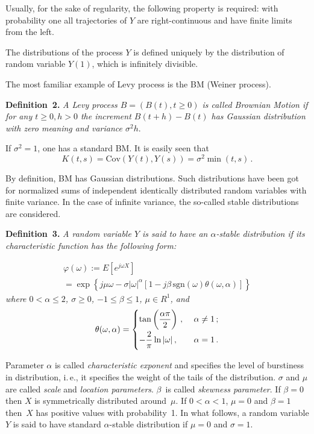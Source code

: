 \begin{multicols}{2}
\smallskip

Usually, for the sake of regularity,  the following property is required: with 
probability one all trajectories of $Y$ are right-continuous and have finite limits 
from the left. 

The distributions of the process $Y$ is defined uniquely by the distribution of 
random variable $Y(1)$, which is infinitely divisible. 

The most familiar example of Levy process is the BM (Weiner process). 

\smallskip

\noindent
\textbf{Definition~2.} 
\textit{A Levy process $B = (B(t), t\geq 0)$ is called Brownian Motion if for any 
$t\geq 0, h>0$ the increment 
$B(t+h) -B(t)$ has Gaussian distribution with zero meaning and variance $\sigma^2 h$}. 

\smallskip

If $\sigma^2 =1$,  one has a standard BM. It is easily seen that 
$$
K(t,s) = \mbox{Cov} \left(Y(t), Y(s)\right) = \sigma^2 \min (t,s) \, . 
$$

By definition, BM has Gaussian distributions. Such distributions have been got for normalized 
sums of independent identically distributed random variables with finite variance. 
In the case of 
infinite variance,  the so-called stable distributions are considered. 

\smallskip

\noindent
\textbf{Definition~3.} 
\textit{A random variable $Y$ is said to have an $\alpha$-stable distribution if its 
characteristic function has the following form:} 

\noindent
\begin{multline*}
\varphi (\omega ) := E\left[ e^{j\omega X} \right] \\
{}=
\exp \left\{ j\mu\omega - \sigma |\omega |^{\alpha} [1 - j \beta\, \mbox{sgn}\left(\omega \right) 
\theta (\omega , \alpha )] \right\}  
\end{multline*}
\textit{where $0< \alpha \leq 2$, $\sigma\geq 0$, $-1 \leq \beta \leq 1$, $\mu\in R^1$, and} 
$$
\theta (\omega , \alpha ) = 
\begin{cases}
\tan \left( \displaystyle\frac{\displaystyle \alpha \pi \mathstrut}{\displaystyle 2\mathstrut} \right)\,, &\ \alpha \not= 1\,; \\[6pt]
-\displaystyle\frac{\displaystyle 2\mathstrut}{\displaystyle \pi\mathstrut} \ln |\omega |\,,  &\ \alpha =1\,. 
\end{cases}
$$


\smallskip

Parameter $\alpha$ is called {\it characteristic exponent} and specifies the level of 
burstiness in distribution, i.\,e., it specifies the weight of the tails of the distribution. 
$\sigma$ and $\mu$ are called {\it scale} and {\it location parameters}. 
$\beta$~is called {\it skewness parameter}. If $\beta =0$ then $X$ is symmetrically 
distributed around~$\mu$. If $0<\alpha <1$, $\mu =0$ and $\beta =1$ then~$X$ 
has positive 
values with probability~1. In what follows, a random variable $Y$ is said to have  standard 
$\alpha$-stable distribution if $\mu =0$ and $\sigma = 1$. 


\end{multicols}

